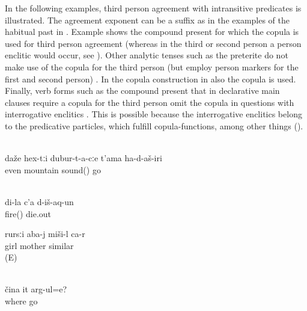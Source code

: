 In the following examples, third person agreement with intransitive predicates is illustrated. The agreement exponent can be a suffix as in the examples of the habitual past in . Example  shows the compound present for which the copula is used for third person agreement (whereas in the third or second person a person enclitic would occur, see ). Other analytic tenses such as the preterite do not make use of the copula for the third person (but employ person markers for the first and second person) . In the copula construction in  also the copula is used. Finally, verb forms such as the compound present that in declarative main clauses require a copula for the third person omit the copula in questions with interrogative enclitics . This is possible because the  interrogative enclitics belong to the predicative particles, which fulfill copula-functions, among other things ().
%
\begin{exe}
		\\	\label{ex:‎The sound went even to the mountains habitual past}
		\gll	daže	hex-tːi	dubur-t-a-cːe	t'ama	ha-d-aš-iri\\
			even		mountain	sound()	go\\
		\glt	{}
		
				\\	\label{ex:My fire died out preterite}
		\gll	di-la	c'a	d-iš-aq-un\\
				fire()	die.out\\
		\glt	{}
		
			\ex	\label{ex:The daughter is similar to her mother}
	\gll	rursːi	aba-j	miši-l ca-r\\
		girl	mother	similar \\
	\glt	{} (E)
		
		\\	\label{ex:Where is s/he going compound present}
		\gll	čina	it	arg-ul=e?\\
			where		go\\
		\glt	{}
\end{exe}

